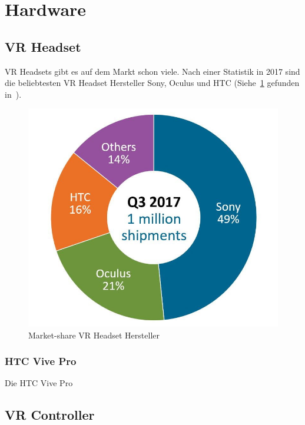 \section{Hardware}

\subsection{VR Headset}\label{sec:vr-headset}

VR Headsets gibt es auf dem Markt schon viele.
Nach einer Statistik in 2017 sind die beliebtesten VR Headset Hersteller Sony, Oculus und HTC (Siehe~\ref{fig:vr_headset_manufacturer_marketshare}\cite{MARTINDALE_2017} gefunden in~\cite{CANKAYA_2019}).

\begin{figure}
    \includegraphics[scale=0.5]{pics/vr_headset_manufacturer_marketshare}
    \caption{Market-share VR Headset Hersteller}
    \label{fig:vr_headset_manufacturer_marketshare}
\end{figure}

\subsubsection{HTC Vive Pro}

Die HTC Vive Pro

\subsection{VR Controller}\label{sec:vr-controller}

